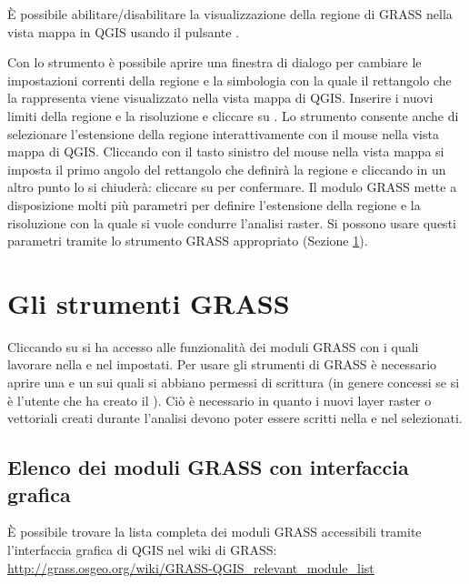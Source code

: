 È possibile abilitare/disabilitare la visualizzazione della regione di GRASS
nella vista mappa in QGIS usando il pulsante . 

Con lo strumento 
è possibile aprire una finestra di dialogo per cambiare le impostazioni
correnti della regione e la simbologia con la quale il rettangolo che la
rappresenta viene visualizzato nella vista mappa di QGIS. Inserire i nuovi
limiti della regione e la risoluzione e cliccare su . Lo strumento
consente anche di selezionare l'estensione della regione interattivamente con
il mouse nella vista mappa di QGIS. Cliccando con il tasto sinistro del
mouse nella vista mappa si imposta il primo angolo del rettangolo che definirà
la regione e cliccando in un altro punto lo si chiuderà: cliccare su
 per confermare.
Il modulo GRASS  mette a disposizione molti più parametri
per definire l'estensione della regione e la risoluzione con la quale si vuole
condurre l'analisi raster. Si possono usare questi parametri tramite lo
strumento GRASS appropriato (Sezione \ref{subsec:grass_toolbox}).

\section{Gli strumenti GRASS}\label{subsec:grass_toolbox}

Cliccando su  si ha accesso
alle funzionalità dei moduli GRASS con i quali lavorare nella
 e nel  impostati. Per usare gli strumenti
di GRASS è necessario aprire una  e un 
sui quali si abbiano permessi di scrittura (in genere concessi se si è
l'utente che ha creato il ). Ciò è necessario in quanto i
nuovi layer raster o vettoriali creati durante l'analisi devono poter essere
scritti nella  e nel  selezionati.

\subsection{Elenco dei moduli GRASS con interfaccia grafica}

È possibile trovare la lista completa dei moduli GRASS accessibili tramite l'interfaccia grafica di QGIS 
nel wiki di GRASS: \url{http://grass.osgeo.org/wiki/GRASS-QGIS_relevant_module_list}

